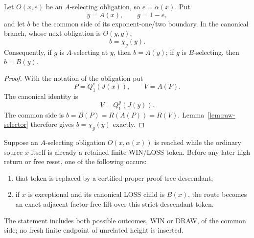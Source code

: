 \begin{lemma}\label{lem:phase-aligned-side}
Let $O(x,e)$ be an $A$-selecting obligation, so $e=\alpha(x)$.  Put
\[
 y=A(x),\qquad g=1-e,
\]
and let $b$ be the common side of its exponent-one/two boundary.  In the
canonical branch, whose next obligation is $O(y,g)$,
\[
 \boxed{b=\chi_g(y).}
\]
Consequently, if $g$ is $A$-selecting at $y$, then $b=A(y)$; if $g$ is
$B$-selecting, then $b=B(y)$.
\end{lemma}

\begin{proof}
With the notation of the obligation put
\[
 P=Q_1^e(J(x)),\qquad V=A(P).
\]
The canonical identity is
\[
 V=Q_1^g(J(y)).
\]
The common side is $b=B(P)=R(A(P))=R(V)$.  Lemma~\ref{lem:raw-selector}
therefore gives $b=\chi_g(y)$ exactly.
\end{proof}

\begin{lemma}\label{lem:finite-front}
Suppose an $A$-selecting obligation $O(x,\alpha(x))$ is reached while the
ordinary source $x$ itself is already a retained finite WIN/LOSS token.
Before any later high return or free reset, one of the following occurs:
\begin{enumerate}[label=(\alph*)]
\item that token is replaced by a certified proper proof-tree descendant;
\item if $x$ is exceptional and its canonical LOSS child is $B(x)$, the
      route becomes an exact adjacent factor-free lift over this strict
      descendant token.
\end{enumerate}
The statement includes both possible outcomes, WIN or DRAW, of the common
side; no fresh finite endpoint of unrelated height is inserted.
\end{lemma}

